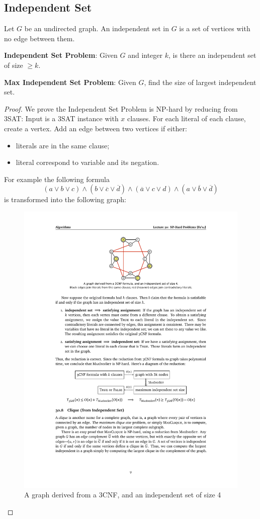 \subsection{Independent Set}
Let $G$ be an undirected graph. An independent set in $G$ is a set of vertices
with no edge between them.

\noindent\textbf{Independent Set Problem}: Given $G$ and integer $k$, is there an independent set of size $\geq k$.

\noindent\textbf{Max Independent Set Problem}: Given $G$, find the size of largest independent set.

\begin{proof}
We prove the Independent Set Problem is NP-hard by reducing from 3SAT:
Input is a 3SAT instance with $x$ clauses.
For each literal of each clause, create a vertex.
Add an edge between two vertices if either:
\begin{itemize}
    \item literals are in the same clause;
    \item literal correspond to variable and its negation.
\end{itemize}
For example the following formula
\[(a \lor b \lor c) \land (b \lor \overline{c} \lor \overline{d}) \land
    (\overline{a} \lor c \lor d) \land (a \lor \overline{b} \lor \overline{d})\]
is transformed into the following graph:

\begin{figure}[H]
    \centering
    \includegraphics[scale=1.5]{fig/indepset}
    \caption{A graph derived from a 3CNF, and an independent set of size 4}
    \label{fig:indepset}
\end{figure}


\end{proof}
